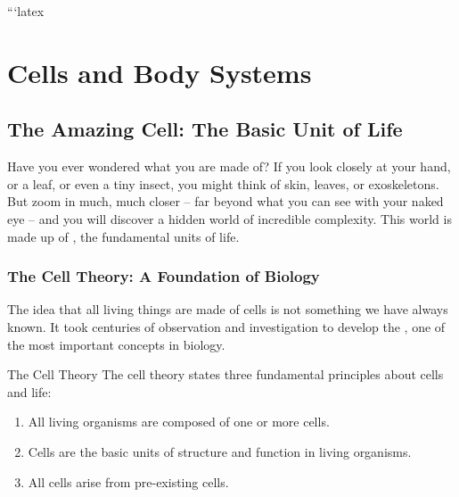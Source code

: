 ```latex
\chapter{Cells and Body Systems}


\section{The Amazing Cell: The Basic Unit of Life}

Have you ever wondered what you are made of?  If you look closely at your hand, or a leaf, or even a tiny insect, you might think of skin, leaves, or exoskeletons. But zoom in much, much closer – far beyond what you can see with your naked eye – and you will discover a hidden world of incredible complexity.  This world is made up of , the fundamental units of life.


\subsection{The Cell Theory: A Foundation of Biology}

The idea that all living things are made of cells is not something we have always known. It took centuries of observation and investigation to develop the , one of the most important concepts in biology.

\begin{keyconcept}{The Cell Theory}
The cell theory states three fundamental principles about cells and life:
\begin{enumerate}
    \item All living organisms are composed of one or more cells.
    \item Cells are the basic units of structure and function in living organisms.
    \item All cells arise from pre-existing cells.
\end{enumerate}
\end{keyconcept}


